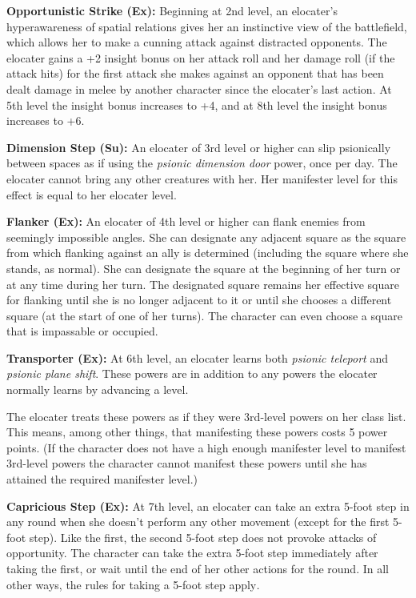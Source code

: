 \documentclass{article}
\begin{document}
\textbf{Opportunistic Strike (Ex):} Beginning at 2nd level, an elocater's hyperawareness 
of spatial relations gives her an instinctive view of the battlefield, which allows 
her to make a cunning attack against distracted opponents. The elocater gains a 
+2 insight bonus on her attack roll and her damage roll (if the attack hits) for 
the first attack she makes against an opponent that has been dealt damage in melee 
by another character since the elocater's last action. At 5th level the insight 
bonus increases to +4, and at 8th level the insight bonus increases to +6.

\textbf{Dimension Step (Su): }An elocater of 3rd level or higher can slip psionically 
between spaces as if using the \textit{psionic dimension door }power, once per 
day. The elocater cannot bring any other creatures with her. Her manifester level 
for this effect is equal to her elocater level.

\textbf{Flanker (Ex):} An elocater of 4th level or higher can flank enemies from 
seemingly impossible angles. She can designate any adjacent square as the square 
from which flanking against an ally is determined (including the square where she 
stands, as normal). She can designate the square at the beginning of her turn or 
at any time during her turn. The designated square remains her effective square 
for flanking until she is no longer adjacent to it or until she chooses a different 
square (at the start of one of her turns). The character can even choose a square 
that is impassable or occupied.

\textbf{Transporter (Ex): }At 6th level, an elocater learns both \textit{psionic 
teleport }and \textit{psionic plane shift}. These powers are in addition to any 
powers the elocater normally learns by advancing a level.

The elocater treats these powers as if they were 3rd-level powers on her class 
list. This means, among other things, that manifesting these powers costs 5 power 
points. (If the character does not have a high enough manifester level to manifest 
3rd-level powers the character cannot manifest these powers until she has attained 
the required manifester level.)

\textbf{Capricious Step (Ex):} At 7th level, an elocater can take an extra 5-foot 
step in any round when she doesn't perform any other movement (except for the first 
5-foot step). Like the first, the second 5-foot step does not provoke attacks of 
opportunity. The character can take the extra 5-foot step immediately after taking 
the first, or wait until the end of her other actions for the round. In all other 
ways, the rules for taking a 5-foot step apply\textit{.}
\end{document}
